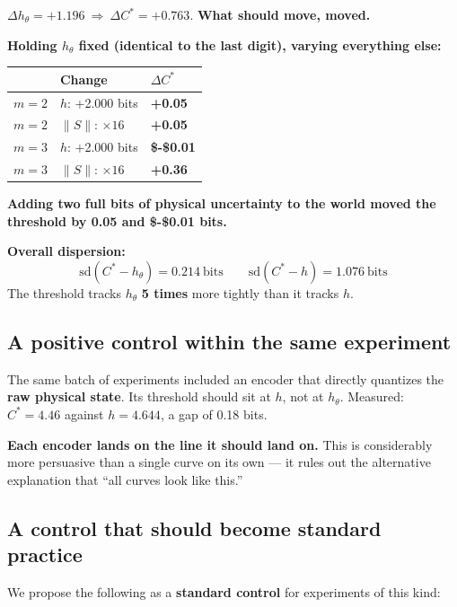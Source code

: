 \documentclass[11pt]{article}
\renewenvironment{quote}
  {\def\FrameCommand{{\color{gray!60}\vrule width 2pt}\hspace{8pt}}%
   \MakeFramed{\advance\hsize-\width \FrameRestore}\begin{itshape}}
  {\end{itshape}\endMakeFramed}
\begin{document}
\(\Delta h_\theta=+1.196\ \Rightarrow\ \Delta C^*=+0.763\). \textbf{What should move, moved.}

\textbf{Holding \(h_\theta\) fixed (identical to the last digit), varying everything else:}

\begin{longtable}[]{@{}lll@{}}
\toprule
& Change & \(\Delta C^*\)\tabularnewline
\midrule
\endhead
\(m=2\) & \(h\): +2.000 bits & \textbf{+0.05}\tabularnewline
\(m=2\) & \(\|S\|\): \(\times16\) & \textbf{+0.05}\tabularnewline
\(m=3\) & \(h\): +2.000 bits & \textbf{\$-\$0.01}\tabularnewline
\(m=3\) & \(\|S\|\): \(\times16\) & \textbf{+0.36}\tabularnewline
\bottomrule
\end{longtable}

\textbf{Adding two full bits of physical uncertainty to the world moved the threshold by 0.05 and \$-\$0.01 bits.}

\textbf{Overall dispersion:}
\[\mathrm{sd}(C^*-h_\theta)=0.214\ \text{bits}\qquad \mathrm{sd}(C^*-h)=1.076\ \text{bits}\]
The threshold tracks \(h_\theta\) \textbf{5 times} more tightly than it tracks \(h\).

\hypertarget{a-positive-control-within-the-same-experiment}{%
\subsection{A positive control within the same experiment}\label{a-positive-control-within-the-same-experiment}}

The same batch of experiments included an encoder that directly quantizes the \textbf{raw physical state}. Its threshold should sit at \(h\), not at \(h_\theta\). Measured: \(C^*=4.46\) against \(h=4.644\), a gap of 0.18 bits.

\begin{quote}
\textbf{Each encoder lands on the line it should land on.} This is considerably more persuasive than a single curve on its own --- it rules out the alternative explanation that ``all curves look like this.''
\end{quote}

\hypertarget{a-control-that-should-become-standard-practice}{%
\subsection{A control that should become standard practice}\label{a-control-that-should-become-standard-practice}}

We propose the following as a \textbf{standard control} for experiments of this kind:
\end{document}
